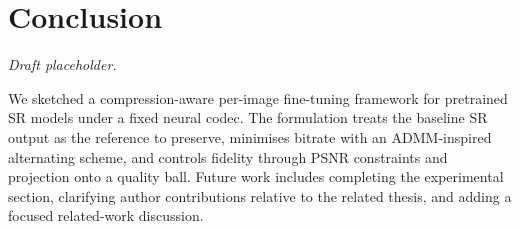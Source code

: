 \section{Conclusion}
\label{sec:conclusion}

\textit{Draft placeholder.}

We sketched a compression-aware per-image fine-tuning framework for pretrained SR models under a fixed neural codec. The formulation treats the baseline SR output as the reference to preserve, minimises bitrate with an ADMM-inspired alternating scheme, and controls fidelity through PSNR constraints and projection onto a quality ball. Future work includes completing the experimental section, clarifying author contributions relative to the related thesis, and adding a focused related-work discussion.
